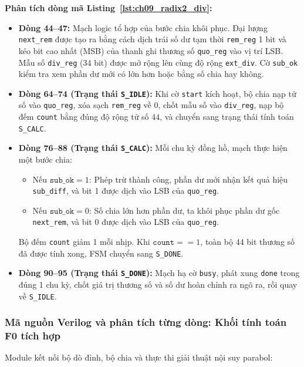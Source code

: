 

\textbf{Phân tích dòng mã Listing~\ref{lst:ch09_radix2_div}:}
\begin{itemize}[leftmargin=1.5em, itemsep=2pt]
    \item \textbf{Dòng 44--47:} Mạch logic tổ hợp của bước chia khôi phục. Đại lượng \texttt{next\_rem} được tạo ra bằng cách dịch trái số dư tạm thời \texttt{rem\_reg} 1 bit và kéo bit cao nhất (MSB) của thanh ghi thương số \texttt{quo\_reg} vào vị trí LSB. Mẫu số \texttt{div\_reg} ($34\text{ bit}$) được mở rộng lên cùng độ rộng \texttt{ext\_div}. Cờ \texttt{sub\_ok} kiểm tra xem phần dư mới có lớn hơn hoặc bằng số chia hay không.
    \item \textbf{Dòng 64--74 (Trạng thái \texttt{S\_IDLE}):} Khi cờ \texttt{start} kích hoạt, bộ chia nạp tử số vào \texttt{quo\_reg}, xóa sạch \texttt{rem\_reg} về 0, chốt mẫu số vào \texttt{div\_reg}, nạp bộ đếm \texttt{count} bằng đúng độ rộng tử số $44$, và chuyển sang trạng thái tính toán \texttt{S\_CALC}.
    \item \textbf{Dòng 76--88 (Trạng thái \texttt{S\_CALC}):} Mỗi chu kỳ đồng hồ, mạch thực hiện một bước chia:
    \begin{itemize}
        \item Nếu $\texttt{sub\_ok} = 1$: Phép trừ thành công, phần dư mới nhận kết quả hiệu \texttt{sub\_diff}, và bit 1 được dịch vào LSB của \texttt{quo\_reg}.
        \item Nếu $\texttt{sub\_ok} = 0$: Số chia lớn hơn phần dư, ta khôi phục phần dư gốc \texttt{next\_rem}, và bit 0 được dịch vào LSB của \texttt{quo\_reg}.
    \end{itemize}
    Bộ đếm \texttt{count} giảm 1 mỗi nhịp. Khi $\texttt{count} == 1$, toàn bộ 44 bit thương số đã được tính xong, FSM chuyển sang \texttt{S\_DONE}.
    \item \textbf{Dòng 90--95 (Trạng thái \texttt{S\_DONE}):} Mạch hạ cờ \texttt{busy}, phát xung \texttt{done} trong đúng 1 chu kỳ, chốt giá trị thương số và số dư hoàn chỉnh ra ngõ ra, rồi quay về \texttt{S\_IDLE}.
\end{itemize}

\subsubsection*{Mã nguồn Verilog và phân tích từng dòng: Khối tính toán F0 tích hợp}
Module  kết nối bộ dò đỉnh, bộ chia và thực thi giải thuật nội suy parabol:

